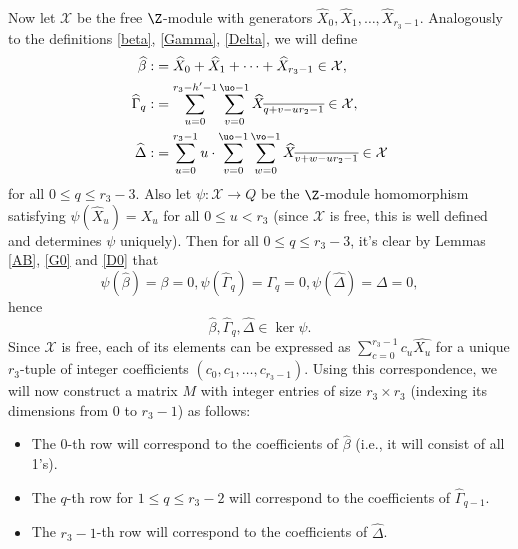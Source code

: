 \paragraph*{}
Now let $\mathcal{X}$ be the free $\Z$-module with generators $\widehat{X}_0,\widehat{X}_1,\dots,\widehat{X}_{r_3-1}$.
Analogously to the definitions \eqref{beta}, \eqref{Gamma}, \eqref{Delta}, we will define 
\begin{align*}
\widehat{\beta}:&=\widehat{X}_0+\widehat{X}_1+\dots+\widehat{X}_{r_3-1}\in \mathcal{X},\\
\widehat{\Gamma}_q:&=\sum_{u=0}^{r_3-h'-1}\sum_{v=0}^{\uo-1}\widehat{X}_{\overline{q+v-ur_2-1}}\in \mathcal{X},\\
\widehat{\Delta}:&=\sum_{u=0}^{r_3-1}u\cdot\sum_{v=0}^{\uo-1} \sum _{w=0}^{\vo-1} \widehat{X}_{\overline{v+w-ur_2-1}}\in \mathcal{X}
\end{align*}
for all $0\le q \le r_3-3$. Also let $\psi:\mathcal{X}\to Q$ be the $\Z$-module homomorphism satisfying $\psi(\widehat{X}_u)=X_u$ for all $0\le u <r_3$ (since $\mathcal{X}$ is free, this is well defined and determines $\psi$ uniquely). Then for all $0\le q \le r_3-3$, it's clear by Lemmas \ref{AB}, \ref{G0} and \ref{D0} that $$\psi(\widehat{\beta})=\beta=0, \psi(\widehat{\Gamma}_q)=\Gamma_q=0, \psi(\widehat{\Delta})=\Delta=0,$$
hence 
\begin{equation}\label{kerpsi}
\widehat{\beta}, \widehat{\Gamma}_q, \widehat{\Delta} \in \ker \psi.
\end{equation}
Since $\mathcal{X}$ is free, each of its elements can be expressed as $\sum_{c=0}^{r_3-1}c_u\widehat{X_u}$ for a unique $r_3$-tuple of integer coefficients $(c_0,c_1,\dots,c_{r_3-1})$. Using this correspondence, we will now construct a matrix $M$ with integer entries of size $r_3\times r_3$ (indexing its dimensions from $0$ to $r_3-1$) as follows:
\begin{itemize}
\item The $0$-th row will correspond to the coefficients of $\widehat{\beta}$ (i.e., it will consist of all 1's).
\item The $q$-th row for $1\leq q\leq r_3-2$ will correspond to the coefficients of $\widehat{\Gamma}_{q-1}$.
\item The $r_3-1$-th row will correspond to the coefficients of $\widehat{\Delta}$.
\end{itemize}

